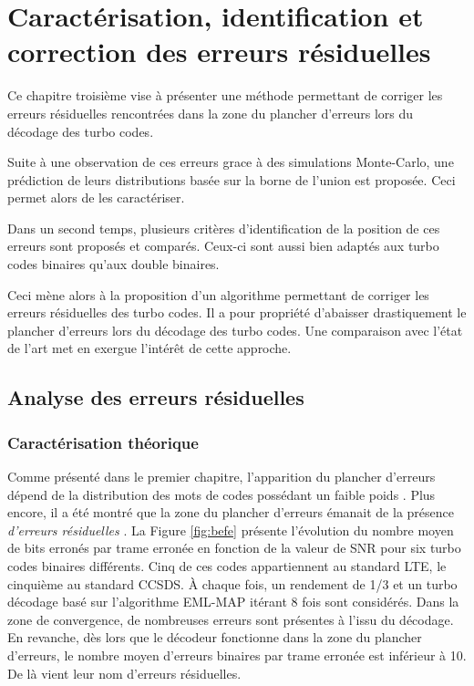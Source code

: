 \chapter{Caractérisation, identification et correction des erreurs résiduelles} %
Ce chapitre troisième vise à présenter une méthode permettant de corriger les erreurs résiduelles rencontrées dans la zone
du plancher d'erreurs lors du décodage des turbo codes.

Suite à une observation de ces erreurs grace à des simulations Monte-Carlo, une prédiction de leurs distributions basée sur la borne de l'union est proposée. 
Ceci permet alors de les caractériser.

Dans un second temps, plusieurs critères d'identification de la position de ces erreurs sont proposés et comparés. Ceux-ci 
sont aussi bien adaptés aux turbo codes binaires qu'aux double binaires.

Ceci mène alors à la proposition d'un algorithme permettant de corriger les erreurs résiduelles des turbo codes.
Il a pour propriété d'abaisser drastiquement le plancher d'erreurs lors du décodage des turbo codes.
Une comparaison avec l'état de l'art met en exergue l’intérêt de cette approche.


\vspace*{\fill}
\minitocTITI
\vspace*{\fill}
\newpage

\section{Analyse des erreurs résiduelles}
\subsection{Caractérisation théorique}
Comme présenté dans le premier chapitre, l'apparition du plancher d'erreurs dépend de la distribution des mots de codes 
possédant un faible poids \cite{distance_spectrum}. Plus encore, il a été montré que la zone du plancher d'erreurs émanait 
de la présence \emph{d'erreurs résiduelles} \cite{takeshitaBCH}. 
La Figure \ref{fig:befe} présente l'évolution du nombre moyen de bits erronés par trame erronée en fonction de la valeur de 
SNR pour six turbo codes binaires différents. Cinq de ces codes appartiennent au standard LTE, le cinquième au standard CCSDS. 
À chaque fois, un rendement de 1/3 et un turbo décodage basé sur l'algorithme EML-MAP itérant 8 fois sont considérés. Dans la zone de 
convergence, de nombreuses erreurs sont présentes  à l'issu du décodage. En revanche, dès lors que le décodeur 
fonctionne dans la zone du plancher d'erreurs, le nombre moyen d'erreurs binaires par trame erronée est inférieur à 10. 
De là vient leur nom d'erreurs résiduelles.

